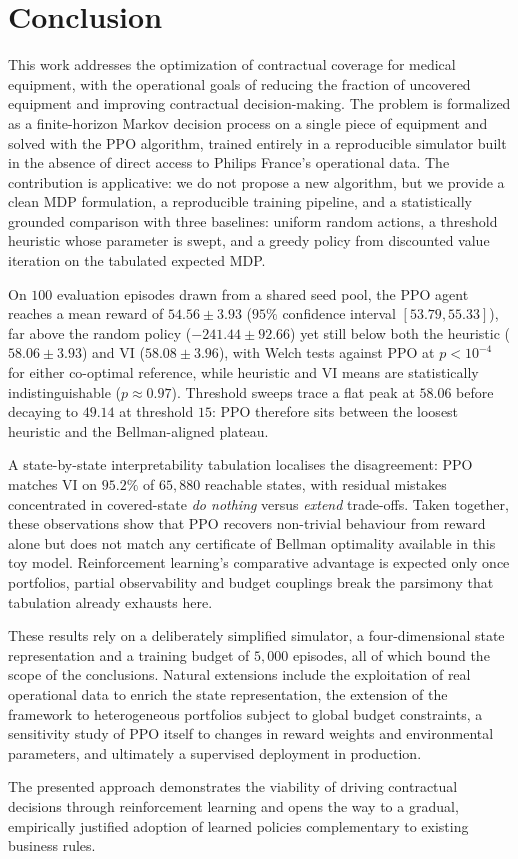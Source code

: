 \section{Conclusion}
\label{sec:conclusion}

This work addresses the optimization of contractual coverage for medical equipment, with the operational goals of reducing the fraction of uncovered equipment and improving contractual decision-making. The problem is formalized as a finite-horizon Markov decision process on a single piece of equipment and solved with the PPO algorithm, trained entirely in a reproducible simulator built in the absence of direct access to Philips France's operational data. The contribution is applicative: we do not propose a new algorithm, but we provide a clean MDP formulation, a reproducible training pipeline, and a statistically grounded comparison with three baselines: uniform random actions, a threshold heuristic whose parameter is swept, and a greedy policy from discounted value iteration on the tabulated expected MDP.

On $100$ evaluation episodes drawn from a shared seed pool, the PPO agent reaches a mean reward of $54.56 \pm 3.93$ ($95\%$ confidence interval $[53.79, 55.33]$), far above the random policy ($-241.44 \pm 92.66$) yet still below both the heuristic ($58.06 \pm 3.93$) and VI ($58.08 \pm 3.96$), with Welch tests against PPO at $p < 10^{-4}$ for either co-optimal reference, while heuristic and VI means are statistically indistinguishable ($p \approx 0.97$). Threshold sweeps trace a flat peak at $58.06$ before decaying to $49.14$ at threshold $15$: PPO therefore sits between the loosest heuristic and the Bellman-aligned plateau.

A state-by-state interpretability tabulation localises the disagreement: PPO matches VI on $95.2\%$ of $65{,}880$ reachable states, with residual mistakes concentrated in covered-state \emph{do nothing} versus \emph{extend} trade-offs. Taken together, these observations show that PPO recovers non-trivial behaviour from reward alone but does not match any certificate of Bellman optimality available in this toy model. Reinforcement learning's comparative advantage is expected only once portfolios, partial observability and budget couplings break the parsimony that tabulation already exhausts here.

These results rely on a deliberately simplified simulator, a four-dimensional state representation and a training budget of $5{,}000$ episodes, all of which bound the scope of the conclusions. Natural extensions include the exploitation of real operational data to enrich the state representation, the extension of the framework to heterogeneous portfolios subject to global budget constraints, a sensitivity study of PPO itself to changes in reward weights and environmental parameters, and ultimately a supervised deployment in production.

The presented approach demonstrates the viability of driving contractual decisions through reinforcement learning and opens the way to a gradual, empirically justified adoption of learned policies complementary to existing business rules.